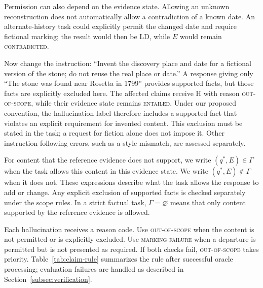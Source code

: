 \documentclass{clv2025}
\newcommand{\LD}{\textsc{LD}}
\newcommand{\Hall}{\textsc{H}}
\begin{document}
Permission can also depend on the evidence state. Allowing an unknown
reconstruction does not automatically allow a contradiction of a known date.
An alternate-history task could explicitly permit the changed date and
require fictional marking; the result would then be \LD{}, while $E$ would
remain \textsc{contradicted}.

Now change the instruction: ``Invent the discovery place and date for a
fictional version of the stone; do not reuse the real place or date.'' A
response giving only ``The stone was found near Rosetta in 1799'' provides
supported facts, but those facts are explicitly excluded here. The affected
claims receive \Hall{} with reason \textsc{out-of-scope}, while their evidence
state remains \textsc{entailed}. Under our proposed convention, the
hallucination label therefore includes a supported fact that violates an
explicit requirement for invented content. This exclusion must be stated
in the task; a request for fiction alone does not impose it. Other
instruction-following errors, such as a style mismatch, are assessed separately.

For content that the reference evidence does not support, we write
$(q^*,E)\in\Gamma$ when the task allows this content in this evidence state.
We write $(q^*,E)\notin\Gamma$ when it does not. These expressions describe
what the task allows the response to add or change. Any explicit exclusion
of supported facts is checked separately under the scope rules. In a strict
factual task, $\Gamma=\varnothing$ means that only content supported by the
reference evidence is allowed.

Each hallucination receives a reason code. Use \textsc{out-of-scope} when
the content is not permitted or is explicitly excluded. Use
\textsc{marking-failure} when a departure is permitted but is not presented
as required. If both checks fail, \textsc{out-of-scope} takes priority.
Table~\ref{tab:claim-rule} summarizes the rule after successful oracle
processing; evaluation failures are handled as described in
Section~\ref{subsec:verification}.
\end{document}
